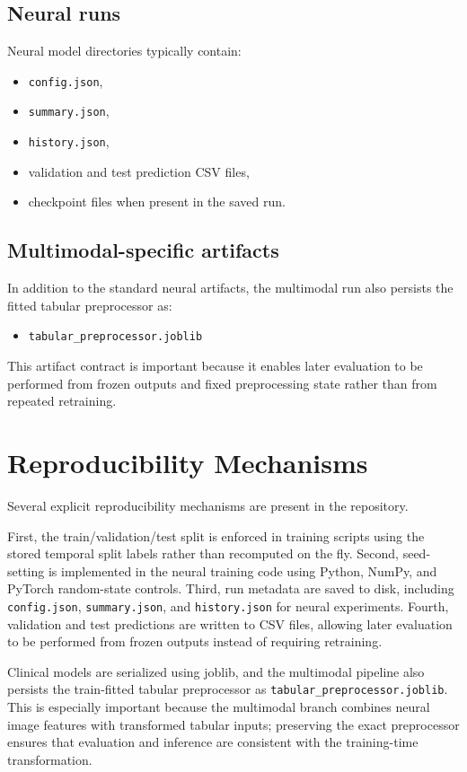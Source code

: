 \subsection*{Neural runs}
Neural model directories typically contain:
\begin{itemize}
    \item \texttt{config.json},
    \item \texttt{summary.json},
    \item \texttt{history.json},
    \item validation and test prediction CSV files,
    \item checkpoint files when present in the saved run.
\end{itemize}

\subsection*{Multimodal-specific artifacts}
In addition to the standard neural artifacts, the multimodal run also persists the fitted tabular preprocessor as:
\begin{itemize}
    \item \texttt{tabular\_preprocessor.joblib}
\end{itemize}

This artifact contract is important because it enables later evaluation to be performed from frozen outputs and fixed preprocessing state rather than from repeated retraining.

\section{Reproducibility Mechanisms}

Several explicit reproducibility mechanisms are present in the repository.

First, the train/validation/test split is enforced in training scripts using the stored temporal split labels rather than recomputed on the fly. Second, seed-setting is implemented in the neural training code using Python, NumPy, and PyTorch random-state controls. Third, run metadata are saved to disk, including \texttt{config.json}, \texttt{summary.json}, and \texttt{history.json} for neural experiments. Fourth, validation and test predictions are written to CSV files, allowing later evaluation to be performed from frozen outputs instead of requiring retraining.

Clinical models are serialized using joblib, and the multimodal pipeline also persists the train-fitted tabular preprocessor as \texttt{tabular\_preprocessor.joblib}. This is especially important because the multimodal branch combines neural image features with transformed tabular inputs; preserving the exact preprocessor ensures that evaluation and inference are consistent with the training-time transformation.

